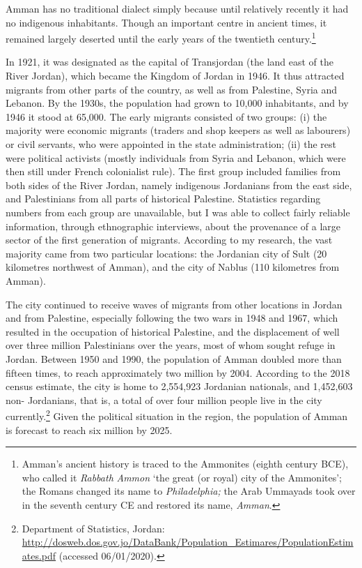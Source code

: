 \documentclass[output=paper]{langsci/langscibook}
\begin{document}
Amman has no traditional dialect simply because until relatively recently it had no indigenous inhabitants. Though an important centre in ancient times, it remained largely deserted until the early years of the twentieth century.\footnote{Amman’s ancient history is traced to the Ammonites (eighth century BCE), who called it \textit{Rabbath} \textit{Ammon} ‘the great (or royal) city of the Ammonites’; the Romans changed its name to \textit{Philadelphia;} the Arab Ummayads took over in the seventh century CE and restored its  name, \textit{Amman}.}

In 1921, it was designated as the capital of Transjordan (the land east of the River Jordan), which became the Kingdom of Jordan in 1946. It thus attracted migrants from other parts of the country, as well as from Palestine, Syria and Lebanon. By the 1930s, the population had grown to 10,000 inhabitants, and by 1946 it stood at 65,000. The early migrants consisted of two groups: (i) the majority were economic migrants (traders and shop keepers as well as labourers) or civil servants, who were appointed in the state administration; (ii) the rest were political activists (mostly individuals from Syria and Lebanon, which were then still under French colonialist rule). The first group included families from both sides of the River Jordan, namely indigenous Jordanians from the east side, and Palestinians from all parts of historical Palestine. Statistics regarding numbers from each group are unavailable, but I was able to collect fairly reliable information, through ethnographic interviews, about the provenance of a large sector of the first generation of migrants. According to my research, the vast majority came from two particular locations: the Jordanian city of Sult (20 kilometres northwest of Amman), and the  city of Nablus (110 kilometres from Amman).

The city continued to receive waves of migrants from other locations in Jordan and from Palestine, especially following the two wars in 1948 and 1967, which resulted in the occupation of historical Palestine, and the displacement of well over three million Palestinians over the years, most of whom sought refuge in Jordan. Between 1950 and 1990, the population of Amman doubled more than fifteen times, to reach approximately two million by 2004. According to the 2018 census estimate, the city is home to 2,554,923 Jordanian nationals, and 1,452,603 non- Jordanians, that is, a total of over four million people live in the city currently.\footnote{Department of Statistics, Jordan: \url{http://dosweb.dos.gov.jo/DataBank/Population_Estimares/PopulationEstimates.pdf} (accessed 06/01/2020).} Given the political situation in the region, the population of Amman is forecast to reach six million by 2025. 
\end{document}
